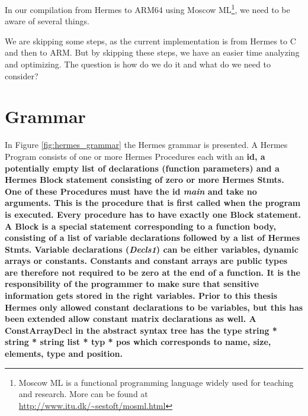 In our compilation from Hermes to ARM64 using Moscow ML\footnote{Moscow ML is a functional programming language widely used for teaching and research. More can be found at \url{http://www.itu.dk/~sestoft/mosml.html}}, we need to be aware of several things.

We are skipping some steps, as the current implementation is from Hermes to C and then to ARM.
But by skipping these steps, we have an easier time analyzing and optimizing. The question is how do we do it and what do we need to consider?

\section{Grammar}
In Figure \ref{fig:hermes_grammar} the Hermes grammar is presented.
A Hermes Program consists of one or more Hermes Procedures each with an \bf{id}, a potentially empty list of declarations (function parameters) and a Hermes Block statement consisting of zero or more Hermes Stmts.
One of these Procedures must have the \bf{id} \emph{main} and take no arguments. This is the procedure that is first called when the program is executed.
Every procedure has to have exactly one Block statement. A Block is a special statement corresponding to a function body, consisting of a list of variable declarations followed by a list of Hermes Stmts.
Variable declarations (\emph{Decls1}) can be either variables, dynamic arrays or constants. Constants and constant arrays are public types are therefore not required to be zero at the end of a function. It is the responsibility of the programmer to make sure that sensitive information gets stored in the right variables.
Prior to this thesis Hermes only allowed constant declarations to be variables, but this has been extended allow constant matrix declarations as well.
A ConstArrayDecl in the abstract syntax tree has the type \bf{string * string * string list * typ * pos} which corresponds to name, size, elements, type and position.



\clearpage
\newpage

